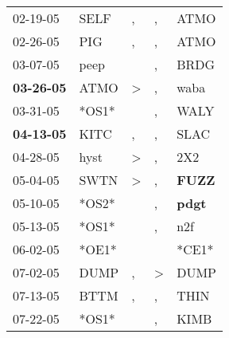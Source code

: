 \begin{supertabular}{p{0.07\textwidth}p{0.06\textwidth}p{0.02\textwidth}p{0.02\textwidth}p{0.06\textwidth}}
          02-19-05\textsuperscript{} &           SELF\textsuperscript{} &                , &                , &           ATMO\textsuperscript{} \\
          02-26-05\textsuperscript{} &            PIG\textsuperscript{} &                , &                , &           ATMO\textsuperscript{} \\
          03-07-05\textsuperscript{} &           peep\textsuperscript{} &                  &                , &           BRDG\textsuperscript{} \\
 \textbf{03-26-05\textsuperscript{}} &           ATMO\textsuperscript{} &     \textgreater &                , &           waba\textsuperscript{} \\
          03-31-05\textsuperscript{} &                            *OS1* &                  &                , &           WALY\textsuperscript{} \\
 \textbf{04-13-05\textsuperscript{}} &           KITC\textsuperscript{} &                , &                , &           SLAC\textsuperscript{} \\
          04-28-05\textsuperscript{} &           hyst\textsuperscript{} &     \textgreater &                , &            2X2\textsuperscript{} \\
          05-04-05\textsuperscript{} &           SWTN\textsuperscript{} &     \textgreater &                , &  \textbf{FUZZ\textsuperscript{}} \\
          05-10-05\textsuperscript{} &                            *OS2* &                  &                , &  \textbf{pdgt\textsuperscript{}} \\
          05-13-05\textsuperscript{} &                            *OS1* &                  &                , &            n2f\textsuperscript{} \\
          06-02-05\textsuperscript{} &                            *OE1* &                  &                  &                            *CE1* \\
          07-02-05\textsuperscript{} &           DUMP\textsuperscript{} &                , &     \textgreater &           DUMP\textsuperscript{} \\
          07-13-05\textsuperscript{} &           BTTM\textsuperscript{} &                , &                , &           THIN\textsuperscript{} \\
          07-22-05\textsuperscript{} &                            *OS1* &                  &                , &           KIMB\textsuperscript{} \\

\end{supertabular}

